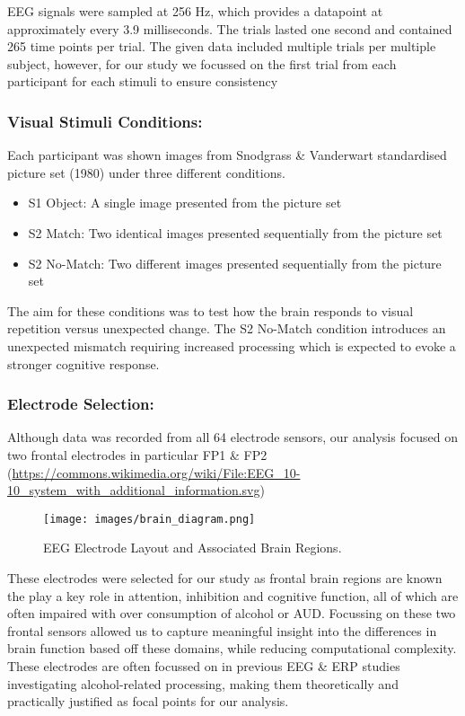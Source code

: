 \documentclass{article}
\begin{document}
EEG signals were sampled at 256 Hz, which provides a datapoint at
approximately every 3.9 milliseconds. The trials lasted one second and
contained 265 time points per trial. The given data included multiple
trials per multiple subject, however, for our study we focussed on the
first trial from each participant for each stimuli to ensure consistency

\subsubsection{Visual Stimuli
Conditions:}\label{visual-stimuli-conditions}

Each participant was shown images from Snodgrass \& Vanderwart
standardised picture set (1980) under three different conditions.

\begin{itemize}
\item
  S1 Object: A single image presented from the picture set
\item
  S2 Match: Two identical images presented sequentially from the picture
  set
\item
  S2 No-Match: Two different images presented sequentially from the
  picture set
\end{itemize}

The aim for these conditions was to test how the brain responds to
visual repetition versus unexpected change. The S2 No-Match condition
introduces an unexpected mismatch requiring increased processing which
is expected to evoke a stronger cognitive response.

\subsubsection{Electrode Selection:}\label{electrode-selection}

Although data was recorded from all 64 electrode sensors, our analysis
focused on two frontal electrodes in particular FP1 \& FP2
(\url{https://commons.wikimedia.org/wiki/File:EEG_10-10_system_with_additional_information.svg})

\begin{figure}[H]
\centering
\texttt{[image: images/brain\_diagram.png]}
\caption{EEG Electrode Layout and Associated Brain Regions.}
\end{figure}

These electrodes were selected for our study as frontal brain regions
are known the play a key role in attention, inhibition and cognitive
function, all of which are often impaired with over consumption of
alcohol or AUD. Focussing on these two frontal sensors allowed us to
capture meaningful insight into the differences in brain function based
off these domains, while reducing computational complexity. These
electrodes are often focussed on in previous EEG \& ERP studies
investigating alcohol-related processing, making them theoretically and
practically justified as focal points for our analysis.
\end{document}
